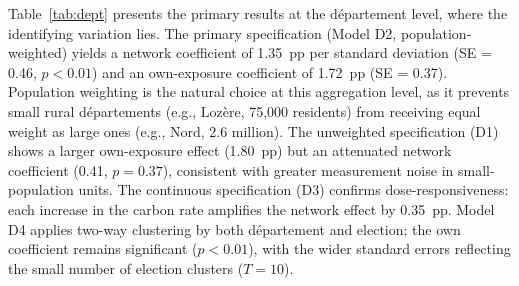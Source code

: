 \documentclass[12pt]{article}
\providecommand{\euro}{\texteuro}
\newcommand{\dept}{d\'{e}partement}
\newcommand{\depts}{d\'{e}partements}
\begin{document}
Table~\ref{tab:dept} presents the primary results at the \dept{} level, where the identifying variation lies. The primary specification (Model D2, population-weighted) yields a network coefficient of 1.35~pp per standard deviation (SE = 0.46, $p < 0.01$) and an own-exposure coefficient of 1.72~pp (SE = 0.37). Population weighting is the natural choice at this aggregation level, as it prevents small rural \depts{} (e.g., Loz\`{e}re, 75,000 residents) from receiving equal weight as large ones (e.g., Nord, 2.6 million). The unweighted specification (D1) shows a larger own-exposure effect (1.80~pp) but an attenuated network coefficient (0.41, $p = 0.37$), consistent with greater measurement noise in small-population units. The continuous specification (D3) confirms dose-responsiveness: each \euro 10 increase in the carbon rate amplifies the network effect by 0.35~pp. Model D4 applies two-way clustering by both \dept{} and election; the own coefficient remains significant ($p < 0.01$), with the wider standard errors reflecting the small number of election clusters ($T = 10$).
\end{document}
